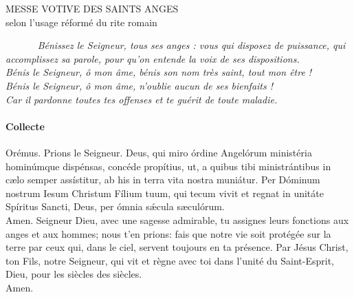 \documentclass[twoside]{article}
\begin{document}
\null \newpage

\sloppy

\begin{center}\begin{doublespace}
{
\MakeUppercase{\Large Messe votive des saints anges}\\
selon l'usage réformé du rite romain
}
\end{doublespace}\end{center}



~~~~~~
\emph{\rr Bénissez le Seigneur, tous ses anges : vous qui disposez de puissance, qui accomplissez sa parole, pour qu’on entende la voix de ses dispositions.\\
\vv {} Bénis le Seigneur, ô mon âme, bénis son nom très saint, tout mon être !\\
\vv {} Bénis le Seigneur, ô mon âme, n'oublie aucun de ses bienfaits !\\
\vv {} Car il pardonne toutes tes offenses et te guérit de toute maladie.}


\paragraph{Collecte}

\begin{paracol}{2}
\vv Orémus.
\switchcolumn
\vv Prions le Seigneur.
\switchcolumn*
Deus, qui miro órdine
Angelórum ministéria hominúmque dispénsas,
concéde propítius,
ut, a quibus tibi ministrántibus in cælo semper assístitur,
ab his in terra vita nostra muniátur.
Per Dóminum nostrum Iesum Christum Fílium
tuum, qui tecum vivit et regnat in unitáte Spíritus Sancti, Deus, per ómnia
sǽcula sæculórum.\\
\rr Amen.
\switchcolumn
Seigneur Dieu,
avec une sagesse admirable,
tu assignes leurs fonctions aux anges et aux hommes;
nous t'en prions:
fais que notre vie soit protégée sur la terre
par ceux qui, dans le ciel,
servent toujours en ta présence.
Par Jésus Christ, ton Fils, notre Seigneur,
qui vit et règne avec toi dans l'unité du Saint-Esprit,
Dieu, pour les siècles des siècles.\\
\rr Amen.
\end{paracol}
\end{document}
